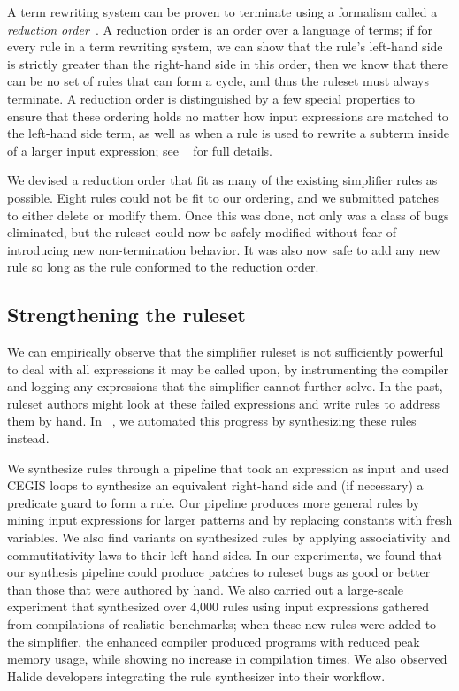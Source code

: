 A term rewriting system can be proven to terminate using a formalism called a \emph{reduction order}~\cite{baader1999term}. A reduction order is an order over a language of terms; if for every rule in a term rewriting system, we can show that the rule's left-hand side is strictly greater than the right-hand side in this order, then we know that there can be no set of rules that can form a cycle, and thus the ruleset must always terminate. A reduction order is distinguished by a few special properties to ensure that these ordering holds no matter how input expressions are matched to the left-hand side term, as well as when a rule is used to rewrite a subterm inside of a larger input expression; see ~\cite{newcomb2020verifying} for full details.

We devised a reduction order that fit as many of the existing simplifier rules as possible. Eight rules could not be fit to our ordering, and we submitted patches to either delete or modify them. Once this was done, not only was a class of bugs eliminated, but the ruleset could now be safely modified without fear of introducing new non-termination behavior. It was also now safe to add any new rule so long as the rule conformed to the reduction order. 

\subsection{Strengthening the ruleset}
We can empirically observe that the simplifier ruleset is not sufficiently powerful to deal with all expressions it may be called upon, by instrumenting the compiler and logging any expressions that the simplifier cannot further solve. In the past, ruleset authors might look at these failed expressions and write rules to address them by hand. In ~\cite{newcomb2020verifying}, we automated this progress by synthesizing these rules instead.

We synthesize rules through a pipeline that took an expression as input and used CEGIS loops to synthesize an equivalent right-hand side and (if necessary) a predicate guard to form a rule. Our pipeline produces more general rules by mining input expressions for larger patterns and by replacing constants with fresh variables. We also find variants on synthesized rules by applying associativity and commutitativity laws to their left-hand sides. In our experiments, we found that our synthesis pipeline could produce patches to ruleset bugs as good or better than those that were authored by hand. We also carried out a large-scale experiment that synthesized over 4,000 rules using input expressions gathered from compilations of realistic benchmarks; when these new rules were added to the simplifier, the enhanced compiler produced programs with reduced peak memory usage, while showing no increase in compilation times. We also observed Halide developers integrating the rule synthesizer into their workflow.

